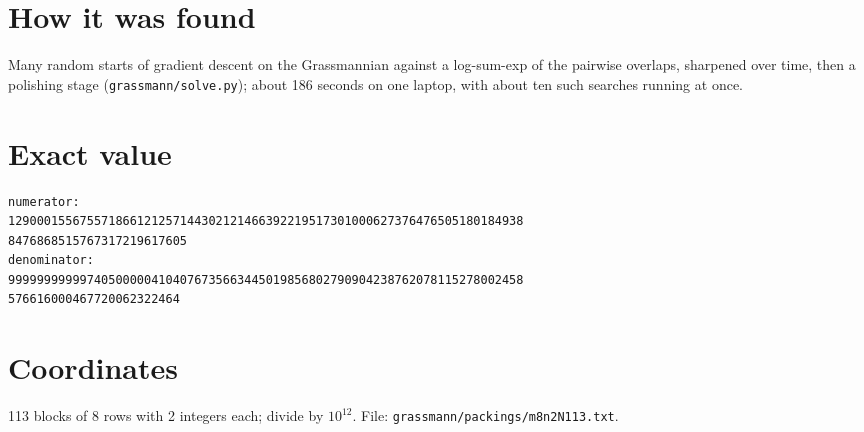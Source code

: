 \documentclass[11pt,a4paper]{article}
\begin{document}
\section{How it was found}
Many random starts of gradient descent on the Grassmannian against a log-sum-exp of the pairwise overlaps, sharpened over time, then a polishing stage (\texttt{grassmann/solve.py}); about 186 seconds on one laptop, with about ten such searches running at once.


\appendix
\section{Exact value}
{\small
\begin{verbatim}
numerator:
129000155675571866121257144302121466392219517301000627376476505180184938
8476868515767317219617605
denominator:
999999999997405000004104076735663445019856802790904238762078115278002458
576616000467720062322464
\end{verbatim}}

\section{Coordinates}
113 blocks of 8 rows with 2 integers each; divide by $10^{12}$. File: \texttt{grassmann/packings/m8n2N113.txt}.
{\tiny
\begin{multicols}{4}
\end{multicols}}
\end{document}
